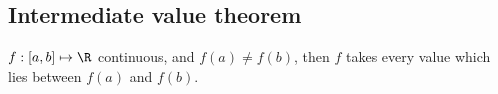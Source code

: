 



\subsection{Intermediate value theorem}

\begin{theorem}\label{thm:intermediate_value}
$f:[a,b]\mapsto \R$ continuous, and $f(a)\neq f(b)$, then $f$ takes every value which lies between $f(a)$ and $f(b)$.
\end{theorem}


